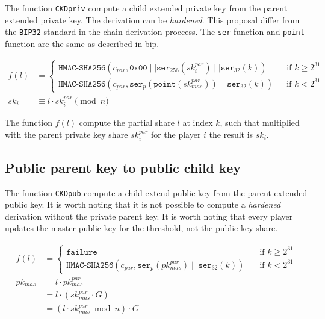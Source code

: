 The function \texttt{CKDpriv} compute a child extended private key from the
parent extended private key. The derivation can be \textit{hardened}. This
proposal differ from the \texttt{BIP32} \cite{HDWallets} standard in the chain
derivation proccess. The \texttt{ser} function and \texttt{point} function are
the same as described in \gls{bip}.

\begin{equation*}
\begin{split}
  f(l) &=
  \begin{cases}
    \texttt{HMAC-SHA256}(c_{par}, \texttt{0x00}\mid\mid \texttt{ser}_{256}(sk_i^{par}) \mid\mid \texttt{ser}_{32}(k)) & \quad \text{if } k \geq 2^{31}\\
    \texttt{HMAC-SHA256}(c_{par}, \texttt{ser}_{p}(\texttt{point}(sk_{mas}^{par})) \mid\mid \texttt{ser}_{32}(k)) & \quad \text{if } k < 2^{31}
  \end{cases} \\
  sk_i &\equiv l \cdot sk_i^{par} \pmod n
\end{split}
\end{equation*}

The function $f(l)$ compute the partial share $l$ at index $k$, such that
multiplied with the parent private key share $sk_i^{par}$ for the player $i$ the
result is $sk_i$.

\subsection{Public parent key to public child key}

The function \texttt{CKDpub} compute a child extend public key from the parent
extended public key. It is worth noting that it is not possible to compute a
\textit{hardened} derivation without the private parent key. It is worth noting
that every player updates the master public key for the threshold, not the
public key share.

\begin{equation*}
\begin{split}
  f(l) &=
  \begin{cases}
    \texttt{failure} & \quad \text{if } k \geq 2^{31}\\
    \texttt{HMAC-SHA256}(c_{par}, \texttt{ser}_{p}(pk_{mas}^{par}) \mid\mid \texttt{ser}_{32}(k)) & \quad \text{if } k < 2^{31}
  \end{cases} \\
  pk_{mas} &= l \cdot pk_{mas}^{par}\\
      &= l \cdot (sk_{mas}^{par} \cdot G)\\
      &= (l \cdot sk_{mas}^{par} \bmod n) \cdot G
\end{split}
\end{equation*}

